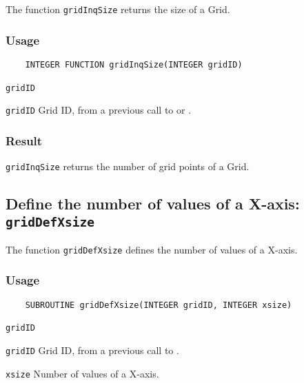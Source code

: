 The function {\texttt{gridInqSize}} returns the size of a Grid.

\subsubsection*{Usage}

\begin{verbatim}
    INTEGER FUNCTION gridInqSize(INTEGER gridID)
\end{verbatim}

\hspace*{4mm}\begin{minipage}[]{15cm}
\begin{deflist}{\texttt{gridID}\ }
\item[\texttt{gridID}]
Grid ID, from a previous call to {} or {}.

\end{deflist}
\end{minipage}

\subsubsection*{Result}

{\texttt{gridInqSize}} returns the number of grid points of a Grid.



\subsection{Define the number of values of a X-axis: \texttt{gridDefXsize}}
\label{gridDefXsize}

The function {\texttt{gridDefXsize}} defines the number of values of a X-axis.

\subsubsection*{Usage}

\begin{verbatim}
    SUBROUTINE gridDefXsize(INTEGER gridID, INTEGER xsize)
\end{verbatim}

\hspace*{4mm}\begin{minipage}[]{15cm}
\begin{deflist}{\texttt{gridID}\ }
\item[\texttt{gridID}]
Grid ID, from a previous call to {}.
\item[\texttt{xsize}]
Number of values of a X-axis.

\end{deflist}
\end{minipage}



